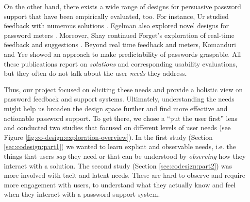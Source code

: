 On the other hand, there exists a wide range of designs for persuasive password support that have been empirically evaluated, too. For instance, Ur \etal studied feedback with numerous solutions \cite{Ur2012HelpingUsersCreateBetterPasswords,Ur2012HowDoesYourPasswordMeasureUp, Ur2017DataDrivenPWMeter}. Egelman \etal also explored novel designs for password meters \cite{Egelman2013DoesMyPasswordGoUpToEleven}. Moreover, Shay \etal continued Forget's exploration of real-time feedback and suggestions \cite{Forget2008ImprovingPasswordsThroughPersuasion, Shay2015SpoonfulOfSugar}. Beyond real time feedback and meters, Komanduri \etal \cite{Komanduri2014Telepathwords} and Yee \cite{Yee2006Passpet} showed an approach to make predictability of passwords graspable. All these publications report on \textit{solutions} and corresponding usability evaluations, but they often do not talk about the user \textit{needs} they address. 

Thus, our project focused on eliciting these needs and provide a holistic view on password feedback and support systems. Ultimately, understanding the needs might help us broaden the design space further and find more effective and actionable password support. To get there, we chose a ``put the user first'' lens and conducted two studies that focused on different levels of user needs (see Figure \ref{fig:co-design:exploration-overview}). In the first study (Section \ref{sec:codesign:part1}) we wanted to learn explicit and observable needs, i.e. the things that users \textit{say} they need or that can be understood by \textit{observing} how they interact with a solution. 
The second study (Section \ref{sec:codesign:part2}) was more involved with tacit and latent needs. These are hard to observe and require more engagement with users, to understand what they actually know and feel when they interact with a password support system. 




